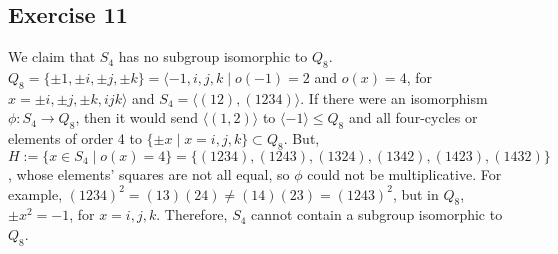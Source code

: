 \subsection*{Exercise 11}
We claim that $S_4$ has no subgroup isomorphic to $Q_8$. $Q_8 = \{\pm1, \pm i, \pm j, \pm k\} = \langle -1, i,j,k \mid o(-1) = 2$ and $o(x) = 4$, for $x = \pm i, \pm j, \pm k, ijk \rangle$ and $S_4 = \langle (12), (1234) \rangle$. If there were an isomorphism $\phi: S_4 \rightarrow Q_8$, then it would send $\langle(1,2)\rangle$ to $\langle-1\rangle \le Q_8$ and all four-cycles or elements of order 4 to $\{\pm x \mid x = i,j,k\} \subset Q_8$. But, $H := \{x \in S_4 \mid o(x) = 4\} = \{(1234),(1243),(1324),(1342),(1423),(1432)\}$, whose elements' squares are not all equal, so $\phi$ could not be multiplicative. For example, $(1234)^2 = (13)(24) \not= (14)(23) = (1243)^2$, but in $Q_8$, $\pm x^2 = -1$, for $x = i,j,k$. Therefore, $S_4$ cannot contain a subgroup isomorphic to $Q_8$.